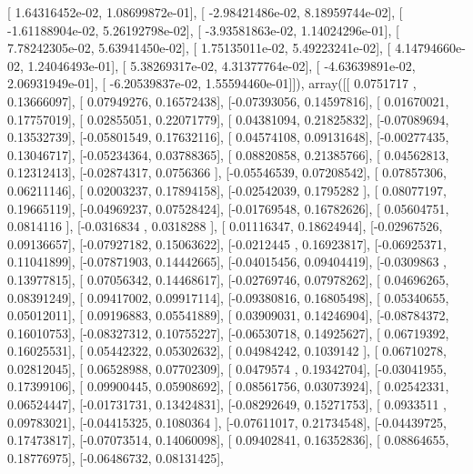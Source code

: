 \documentclass{article}
\begin{document}
       [  1.64316452e-02,   1.08699872e-01],
       [ -2.98421486e-02,   8.18959744e-02],
       [ -1.61188904e-02,   5.26192798e-02],
       [ -3.93581863e-02,   1.14024296e-01],
       [  7.78242305e-02,   5.63941450e-02],
       [  1.75135011e-02,   5.49223241e-02],
       [  4.14794660e-02,   1.24046493e-01],
       [  5.38269317e-02,   4.31377764e-02],
       [ -4.63639891e-02,   2.06931949e-01],
       [ -6.20539837e-02,   1.55594460e-01]]), array([[ 0.0751717 ,  0.13666097],
       [ 0.07949276,  0.16572438],
       [-0.07393056,  0.14597816],
       [ 0.01670021,  0.17757019],
       [ 0.02855051,  0.22071779],
       [ 0.04381094,  0.21825832],
       [-0.07089694,  0.13532739],
       [-0.05801549,  0.17632116],
       [ 0.04574108,  0.09131648],
       [-0.00277435,  0.13046717],
       [-0.05234364,  0.03788365],
       [ 0.08820858,  0.21385766],
       [ 0.04562813,  0.12312413],
       [-0.02874317,  0.0756366 ],
       [-0.05546539,  0.07208542],
       [ 0.07857306,  0.06211146],
       [ 0.02003237,  0.17894158],
       [-0.02542039,  0.1795282 ],
       [ 0.08077197,  0.19665119],
       [-0.04969237,  0.07528424],
       [-0.01769548,  0.16782626],
       [ 0.05604751,  0.0814116 ],
       [-0.0316834 ,  0.0318288 ],
       [ 0.01116347,  0.18624944],
       [-0.02967526,  0.09136657],
       [-0.07927182,  0.15063622],
       [-0.0212445 ,  0.16923817],
       [-0.06925371,  0.11041899],
       [-0.07871903,  0.14442665],
       [-0.04015456,  0.09404419],
       [-0.0309863 ,  0.13977815],
       [ 0.07056342,  0.14468617],
       [-0.02769746,  0.07978262],
       [ 0.04696265,  0.08391249],
       [ 0.09417002,  0.09917114],
       [-0.09380816,  0.16805498],
       [ 0.05340655,  0.05012011],
       [ 0.09196883,  0.05541889],
       [ 0.03909031,  0.14246904],
       [-0.08784372,  0.16010753],
       [-0.08327312,  0.10755227],
       [-0.06530718,  0.14925627],
       [ 0.06719392,  0.16025531],
       [ 0.05442322,  0.05302632],
       [ 0.04984242,  0.1039142 ],
       [ 0.06710278,  0.02812045],
       [ 0.06528988,  0.07702309],
       [ 0.0479574 ,  0.19342704],
       [-0.03041955,  0.17399106],
       [ 0.09900445,  0.05908692],
       [ 0.08561756,  0.03073924],
       [ 0.02542331,  0.06524447],
       [-0.01731731,  0.13424831],
       [-0.08292649,  0.15271753],
       [ 0.0933511 ,  0.09783021],
       [-0.04415325,  0.1080364 ],
       [-0.07611017,  0.21734548],
       [-0.04439725,  0.17473817],
       [-0.07073514,  0.14060098],
       [ 0.09402841,  0.16352836],
       [ 0.08864655,  0.18776975],
       [-0.06486732,  0.08131425],
\end{document}
